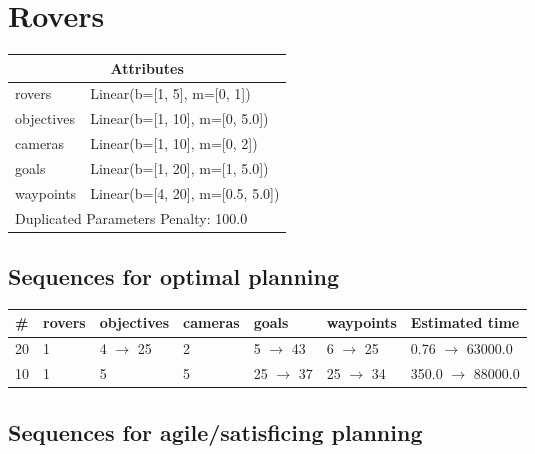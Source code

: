 \documentclass{article}
\begin{document}
                            \newpage \section{Rovers}
                    \begin{center}
                    \begin{tabular}{@{}p{}p{}@{}}
                    \multicolumn{2}{c}{\bf \large Attributes}\\\midrule
                    rovers & Linear(b=[1, 5], m=[0, 1])\\
objectives & Linear(b=[1, 10], m=[0, 5.0])\\
cameras & Linear(b=[1, 10], m=[0, 2])\\
goals & Linear(b=[1, 20], m=[1, 5.0])\\
waypoints & Linear(b=[4, 20], m=[0.5, 5.0]) \\\midrule
                    \multicolumn{2}{l}{Duplicated Parameters Penalty: 100.0}
                    \end{tabular}
                    \end{center}
                
                            \subsection*{Sequences for optimal planning}

                            \begin{center}
                            \begin{tabular}{@{}l|l|l|l|l|l|l@{}}
                            \# & rovers & objectives & cameras & goals & waypoints & Estimated time\\\midrule
                            20&1&4 $\rightarrow$ 25&2&5 $\rightarrow$ 43&6 $\rightarrow$ 25&0.76 $\rightarrow$ 63000.0\\
10&1&5&5&25 $\rightarrow$ 37&25 $\rightarrow$ 34&350.0 $\rightarrow$ 88000.0
                            \end{tabular}
                            \end{center}
                    
                         \subsection*{Sequences for agile/satisficing planning}
\end{document}
